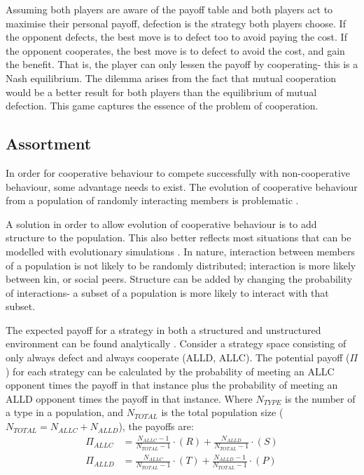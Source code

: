 \documentclass[a4paper,11pt,bcshonoursthesis,singlespace,twoside]{cssethesis}
\begin{document}
Assuming both players are aware of the payoff table and both players act to maximise their personal payoff, defection is the strategy both players choose. 
If the opponent defects, the best move is to defect too to avoid paying the cost. 
If the opponent cooperates, the best move is to defect to avoid the cost, and gain the benefit. 
That is, the player can only lessen the payoff by cooperating- this is a Nash equilibrium. 
The dilemma arises from the fact that mutual cooperation would be a better result for both players than the equilibrium of mutual defection. 
This game captures the essence of the problem of cooperation. %
\subsection{Assortment}
In order for cooperative behaviour to compete successfully with non-cooperative behaviour, some advantage needs to exist. 
The evolution of cooperative behaviour from a population of randomly interacting members is problematic \citep{axelrod:Science:1981}. 

A solution in order to allow evolution of cooperative behaviour is to add structure to the population. 
This also better reflects most situations that can be modelled with evolutionary simulations \citep{eshel:PNAS:1982}. 
In nature, interaction between members of a population is not likely to be randomly distributed; interaction is more likely between kin, or social peers. 
Structure can be added by changing the probability of interactions- a subset of a population is more likely to interact with that subset. 

The expected payoff for a strategy in both a structured and unstructured environment can be found analytically \citep{van-veelen:PNAS:2012}. 
Consider a strategy space consisting of only always defect and always cooperate (ALLD, ALLC). 
The potential payoff ($\Pi$) for each strategy can be calculated by the probability of meeting an ALLC opponent times the payoff in that instance plus the probability of meeting an ALLD opponent times the payoff in that instance. Where $N_{TYPE}$ is the number of a type in a population, and $N_{TOTAL}$ is the total population size ($N_{TOTAL}=N_{ALLC}+ N_{ALLD}$), the payoffs are:
\begin{align*}
\Pi_{ALLC}&=\frac{N_{ALLC}-1}{N_{TOTAL}-1} \cdot (R) + \frac{N_{ALLD}}{N_{TOTAL}-1}\cdot ({S})\\
\Pi_{ALLD}&=\frac{N_{ALLC}}{N_{TOTAL}-1} \cdot (T) + \frac{N_{ALLD}-1}{N_{TOTAL}-1}\cdot ({P})
\end{align*}
\end{document}
